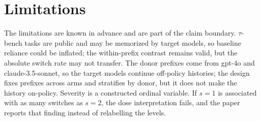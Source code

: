 \documentclass[a4paper,fleqn]{cas-sc}
\begin{document}
\section{Limitations}\label{sec:limitations}

The limitations are known in advance and are part of the claim boundary. $\tau$-bench tasks are
public and may be memorized by target models, so baseline reliance could be inflated; the
within-prefix contrast remains valid, but the absolute switch rate may not transfer. The donor
prefixes come from gpt-4o and claude-3.5-sonnet, so the target models continue off-policy
histories; the design fixes prefixes across arms and stratifies by donor, but it does not make the
history on-policy. Severity is a constructed ordinal variable. If $s=1$ is associated with as many switches as
$s=2$, the dose interpretation fails, and the paper reports that finding instead of relabelling
the levels.
\end{document}
